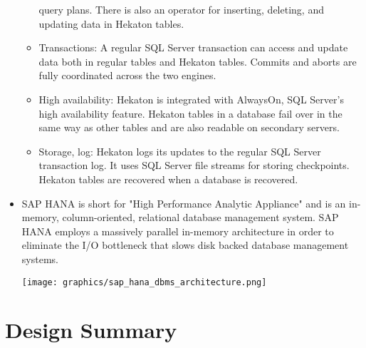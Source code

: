 \documentclass[letterpaper, 12pt]{article}
\begin{document}
\begin{itemize}
\begin{itemize}
  query plans. There is also an operator for inserting, deleting,
  and updating data in Hekaton tables.
  \item Transactions: A regular SQL Server transaction can access
  and update data both in regular tables and Hekaton tables.
  Commits and aborts are fully coordinated across the two engines.
  \item High availability: Hekaton is integrated with AlwaysOn,
  SQL Server’s high availability feature. Hekaton tables in a database
  fail over in the same way as other tables and are also
  readable on secondary servers.
  \item Storage, log: Hekaton logs its updates to the regular SQL
  Server transaction log. It uses SQL Server file streams for storing
  checkpoints. Hekaton tables are recovered when a database is recovered. 
  \end{itemize} \cite{hekaton}
  
  \item SAP HANA
  is short for "High Performance Analytic Appliance" and is an in-memory,
  column-oriented, relational database management system. SAP HANA employs a
  massively parallel in-memory architecture in order to eliminate the I/O bottleneck
  that slows disk backed database management systems.
  \par\vspace{\baselineskip} 
  \texttt{[image: graphics/sap\_hana\_dbms\_architecture.png]}
  \cite{saphana}
  \par\vspace{\baselineskip}
\end{itemize}	
	
\newpage

\section{Design Summary}
\end{document}
